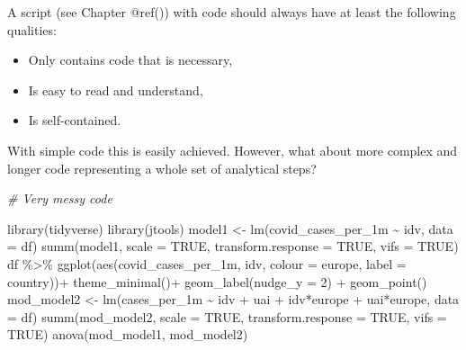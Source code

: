 \documentclass[
]{book}
\newenvironment{Shaded}{\begin{snugshade}}{\end{snugshade}}
\newcommand{\AttributeTok}[1]{\textcolor[rgb]{0.77,0.63,0.00}{#1}}
\newcommand{\CommentTok}[1]{\textcolor[rgb]{0.56,0.35,0.01}{\textit{#1}}}
\newcommand{\ConstantTok}[1]{\textcolor[rgb]{0.00,0.00,0.00}{#1}}
\newcommand{\DecValTok}[1]{\textcolor[rgb]{0.00,0.00,0.81}{#1}}
\newcommand{\FunctionTok}[1]{\textcolor[rgb]{0.00,0.00,0.00}{#1}}
\newcommand{\NormalTok}[1]{#1}
\newcommand{\OtherTok}[1]{\textcolor[rgb]{0.56,0.35,0.01}{#1}}
\newcommand{\SpecialCharTok}[1]{\textcolor[rgb]{0.00,0.00,0.00}{#1}}
\begin{document}
A script (see Chapter @ref()) with code should always have at least the following qualities:

\begin{itemize}
\item
  Only contains code that is necessary,
\item
  Is easy to read and understand,
\item
  Is self-contained.
\end{itemize}

With simple code this is easily achieved. However, what about more complex and longer code representing a whole set of analytical steps?

\begin{Shaded}
\begin{Highlighting}[]
\CommentTok{\# Very messy code}

\FunctionTok{library}\NormalTok{(tidyverse)}
\FunctionTok{library}\NormalTok{(jtools)}
\NormalTok{model1 }\OtherTok{\textless{}{-}} \FunctionTok{lm}\NormalTok{(covid\_cases\_per\_1m }\SpecialCharTok{\textasciitilde{}}\NormalTok{ idv, }\AttributeTok{data =}\NormalTok{ df)}
\FunctionTok{summ}\NormalTok{(model1, }\AttributeTok{scale =} \ConstantTok{TRUE}\NormalTok{, }\AttributeTok{transform.response =} \ConstantTok{TRUE}\NormalTok{, }\AttributeTok{vifs =} \ConstantTok{TRUE}\NormalTok{)}
\NormalTok{df }\SpecialCharTok{\%\textgreater{}\%} \FunctionTok{ggplot}\NormalTok{(}\FunctionTok{aes}\NormalTok{(covid\_cases\_per\_1m, idv, }\AttributeTok{colour =}\NormalTok{ europe, }\AttributeTok{label =}\NormalTok{ country))}\SpecialCharTok{+}
\FunctionTok{theme\_minimal}\NormalTok{()}\SpecialCharTok{+} \FunctionTok{geom\_label}\NormalTok{(}\AttributeTok{nudge\_y =} \DecValTok{2}\NormalTok{) }\SpecialCharTok{+} \FunctionTok{geom\_point}\NormalTok{()}
\NormalTok{mod\_model2 }\OtherTok{\textless{}{-}} \FunctionTok{lm}\NormalTok{(cases\_per\_1m }\SpecialCharTok{\textasciitilde{}}\NormalTok{ idv }\SpecialCharTok{+}\NormalTok{ uai }\SpecialCharTok{+}\NormalTok{ idv}\SpecialCharTok{*}\NormalTok{europe }\SpecialCharTok{+}\NormalTok{ uai}\SpecialCharTok{*}\NormalTok{europe, }\AttributeTok{data =}\NormalTok{ df)}
\FunctionTok{summ}\NormalTok{(mod\_model2, }\AttributeTok{scale =} \ConstantTok{TRUE}\NormalTok{, }\AttributeTok{transform.response =} \ConstantTok{TRUE}\NormalTok{, }\AttributeTok{vifs =} \ConstantTok{TRUE}\NormalTok{)}
\FunctionTok{anova}\NormalTok{(mod\_model1, mod\_model2)}
\end{Highlighting}
\end{Shaded}
\end{document}
